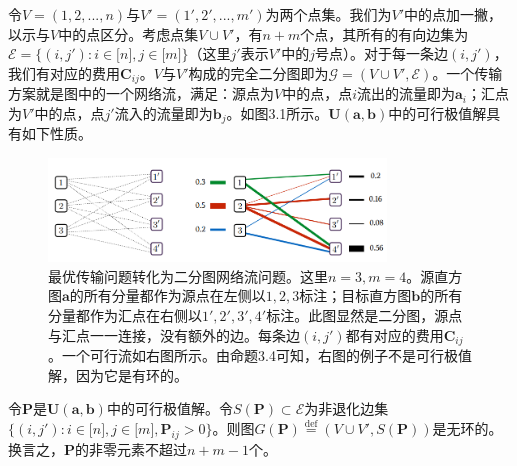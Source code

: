\documentclass[cn,10pt,math=newtx,citestyle=gb7714-2015,bibstyle=gb7714-2015]{elegantbook}
\begin{document}
令$V=(1,2,...,n)$与$V'=(1',2',...,m')$为两个点集。我们为$V'$中的点加一撇，以示与$V$中的点区分。考虑点集$V\cup V'$，有$n+m$个点，其所有的有向边集为$\mathcal{E}=\{(i,j'):i\in\mathbb{[}n\mathbb{]},j\in\mathbb{[}m\mathbb{]}\}$（这里$j'$表示$V'$中的$j$号点）。对于每一条边$(i,j')$，我们有对应的费用$\mathbf{C}_{ij}$。$V$与$V'$构成的完全二分图即为$\mathcal{G}=(V\cup V',\mathcal{E})$。一个传输方案就是图中的一个网络流，满足：源点为$V$中的点，点$i$流出的流量即为$\mathbf{a}_i$；汇点为$V'$中的点，点$j'$流入的流量即为$\mathbf{b}_j$。如图3.1所示。$\mathbf{U(a,b)}$中的可行极值解具有如下性质。

\begin{figure}[H]
    \centering
    \includegraphics[width=0.8\textwidth]{figure/fig3.1.png}
    \caption{最优传输问题转化为二分图网络流问题。这里$n=3,m=4$。源直方图$\mathbf{a}$的所有分量都作为源点在左侧以$1,2,3$标注；目标直方图$\mathbf{b}$的所有分量都作为汇点在右侧以$1',2',3',4'$标注。此图显然是二分图，源点与汇点一一连接，没有额外的边。每条边$(i,j')$都有对应的费用$\mathbf{C}_{ij}$。一个可行流如右图所示。由命题3.4可知，右图的例子不是可行极值解，因为它是有环的。}
    \label{图3.1}
\end{figure}

\begin{proposition}[可行极值解的树形结构]
令$\mathbf{P}$是$\mathbf{U(a,b)}$中的可行极值解。令$S(\mathbf{P})\subset \mathcal{E}$为非退化边集$\{ (i,j'):i\in\mathbb{[}n\mathbb{]},j\in\mathbb{[}m\mathbb{]},\mathbf{P}_{ij}>0 \}$。则图$G(\mathbf{P})\overset{\text{def}}{=}(V\cup V',S(\mathbf{P}))$是无环的。换言之，$\mathbf{P}$的非零元素不超过$n+m-1$个。
\end{proposition}
\end{document}
